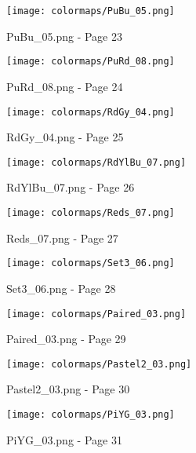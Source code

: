 \documentclass{article}%
\begin{document}
%


\begin{figure}[h!]%
\centering%
\texttt{[image: colormaps/PuBu\_05.png]}%
\caption{PuBu\_05.png {-} Page 23}%
\end{figure}

%


\begin{figure}[h!]%
\centering%
\texttt{[image: colormaps/PuRd\_08.png]}%
\caption{PuRd\_08.png {-} Page 24}%
\end{figure}

%


\begin{figure}[h!]%
\centering%
\texttt{[image: colormaps/RdGy\_04.png]}%
\caption{RdGy\_04.png {-} Page 25}%
\end{figure}

%


\begin{figure}[h!]%
\centering%
\texttt{[image: colormaps/RdYlBu\_07.png]}%
\caption{RdYlBu\_07.png {-} Page 26}%
\end{figure}

%


\begin{figure}[h!]%
\centering%
\texttt{[image: colormaps/Reds\_07.png]}%
\caption{Reds\_07.png {-} Page 27}%
\end{figure}

%


\begin{figure}[h!]%
\centering%
\texttt{[image: colormaps/Set3\_06.png]}%
\caption{Set3\_06.png {-} Page 28}%
\end{figure}

%


\begin{figure}[h!]%
\centering%
\texttt{[image: colormaps/Paired\_03.png]}%
\caption{Paired\_03.png {-} Page 29}%
\end{figure}

%


\begin{figure}[h!]%
\centering%
\texttt{[image: colormaps/Pastel2\_03.png]}%
\caption{Pastel2\_03.png {-} Page 30}%
\end{figure}

%


\begin{figure}[h!]%
\centering%
\texttt{[image: colormaps/PiYG\_03.png]}%
\caption{PiYG\_03.png {-} Page 31}%
\end{figure}
\end{document}
